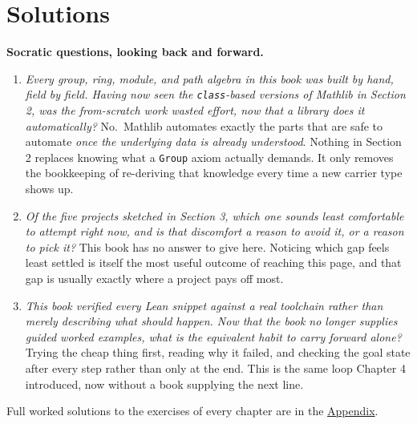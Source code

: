 \section{Solutions}\label{sec:13-next-steps:04-solutions:1}

\textbf{Socratic questions, looking back and forward.}

\begin{enumerate}
\def\labelenumi{\arabic{enumi}.}
\tightlist
\item
  \emph{Every group, ring, module, and path algebra in this book was built by hand, field by field. Having now seen the \texttt{class}-based versions of Mathlib in Section 2, was the from-scratch work wasted effort, now that a library does it automatically?} No.~Mathlib automates exactly the parts that are safe to automate \emph{once the underlying data is already understood}. Nothing in Section 2 replaces knowing what a \texttt{Group} axiom actually demands. It only removes the bookkeeping of re-deriving that knowledge every time a new carrier type shows up.
\item
  \emph{Of the five projects sketched in Section 3, which one sounds least comfortable to attempt right now, and is that discomfort a reason to avoid it, or a reason to pick it?} This book has no answer to give here. Noticing which gap feels least settled is itself the most useful outcome of reaching this page, and that gap is usually exactly where a project pays off most.
\item
  \emph{This book verified every Lean snippet against a real toolchain rather than merely describing what should happen. Now that the book no longer supplies guided worked examples, what is the equivalent habit to carry forward alone?} Trying the cheap thing first, reading why it failed, and checking the goal state after every step rather than only at the end. This is the same loop Chapter 4 introduced, now without a book supplying the next line.
\end{enumerate}

Full worked solutions to the exercises of every chapter are in the \hyperref[sec:14-appendix-solutions:00-index:1]{Appendix}.
